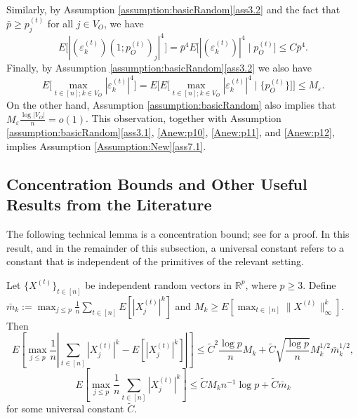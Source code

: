 \documentclass[opre,nonblindrev]{informs3} %
\begin{document}
\begin{APPENDIX}{}
Similarly, by Assumption \ref{assumption:basicRandom}\ref{ass3.2}  and the fact that $\bar{p}\geq p_j^{(t)}$ for all $j\in V_O$, we have
\begin{equation}\label{Anew:p12}
E\bigg[
\left|
(\varepsilon_{k}^{(t)}) (1;p_O^{(t)})_j \right|^4 \bigg]
=
\bar{p}^4
E\bigg[  
\left|
(\varepsilon_{k}^{(t)})  \right|^4 \mid p_O^{(t)} \bigg]
\leq C \bar{p}^4.
\end{equation}
Finally, by Assumption \ref{assumption:basicRandom}\ref{ass3.2} we also have
\begin{equation}\label{Anew:p13}
E\big[ \max_{t\in [n]; k\in V_O} |
\varepsilon_{k}^{(t)} |^4\big]
=
E\big[
E\big[
\max_{t\in [n]; k\in V_O} |
\varepsilon_{k}^{(t)} |^4 \mid \{p_O^{(t)}\}\big]
\big] \leq M_\varepsilon.
\end{equation}
On the other hand, Assumption \ref{assumption:basicRandom} also implies that
$M_\varepsilon \frac{\log|V_O|}{n} =o(1)$.
This observation, together with
Assumption \ref{assumption:basicRandom}\ref{ass3.1},
\eqref{Anew:p10},
\eqref{Anew:p11}, and \eqref{Anew:p12}, implies
Assumption \ref{Assumption:New}\ref{ass7.1}.
\hfill\halmos
\endproof

 	
 	
 	
 	\subsection{Concentration Bounds and Other Useful Results from the Literature}\label{subse:litThms}
 	
The following technical lemma is a concentration bound; see \cite{BRT2014} for a proof.
In this result, and in the remainder of this subsection, a universal constant refers to 
a constant that is independent of the  primitives of the relevant setting.

\begin{lemma}\label{lem:m2bound}
	Let $\{X^{(t)}\}_{t\in[n]}$ be independent random vectors in $\mathbb{R}^p$, where $p\geq 3$. Define $\bar m_k := \max_{j\leq p }\frac{1}{n}\sum_{t\in[n]} {E}[|X^{(t)}_{j}|^k]$ and $M_{k} \geq {E}[ {\displaystyle \max_{t\in [n]}}\|X^{(t)}\|_\infty^k]$. 
	Then
	{\small $${E}\left[\max_{j\leq p}\frac{1}{n}\left|\sum_{t\in [n]}|X_{j}^{(t)}|^k-{E}[|X_{j}^{(t)}|^k]\right|\right] \leq \tilde{C}^2 \frac{\log p}{n}M_{k}+ \tilde{C}\sqrt{\frac{\log p}{n}}M_{k}^{1/2}\bar m_k^{1/2}, $$}
	$${E}\left[\max_{j\leq p}\frac{1}{n}\sum_{t\in[n]}|X_{j}^{(t)}|^k\right] \leq \tilde CM_{k} n^{-1}\log p+ \tilde C\bar m_k $$
	for some universal constant $\tilde C$.%
\end{lemma}



\end{APPENDIX}
\end{document}
